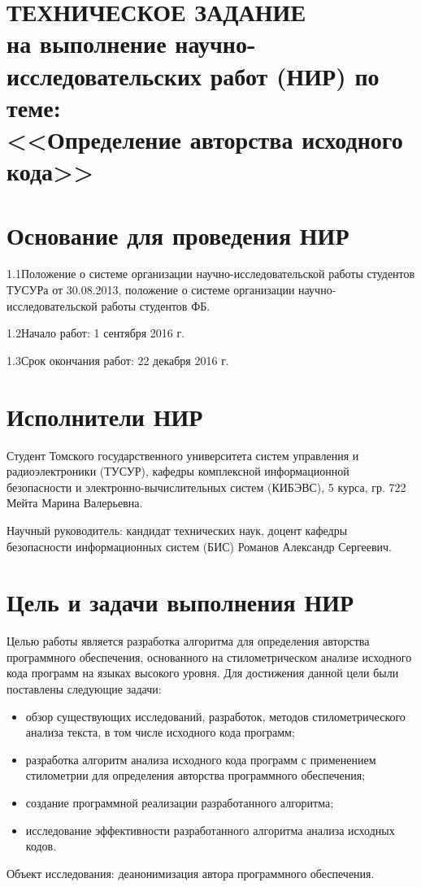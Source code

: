 
\section*{ТЕХНИЧЕСКОЕ ЗАДАНИЕ\\
на выполнение научно-исследовательских работ (НИР) по теме:\\
<<Определение авторства исходного кода>>}


\section{Основание для проведения НИР}

1.1\hspace{5mm}Положение о системе организации научно-исследовательской работы студентов ТУСУРа от 30.08.2013, положение о системе организации научно-исследовательской работы студентов ФБ.
 
1.2\hspace{5mm}Начало работ: 1 сентября 2016 г.

1.3\hspace{5mm}Срок окончания работ: 22 декабря 2016 г.

\section{Исполнители НИР}

Студент Томского государственного университета систем управления и радиоэлектроники (ТУСУР), кафедры комплексной информационной безопасности и электронно-вычислительных систем (КИБЭВС), 5 курса, гр. 722 Мейта Марина Валерьевна.

Научный руководитель: кандидат технических наук, доцент кафедры безопасности информационных систем (БИС) Романов Александр Сергеевич.

\section{Цель и задачи выполнения НИР}

Целью работы является разработка алгоритма для определения авторства программного обеспечения, основанного на стилометрическом анализе исходного кода программ на языках высокого уровня. Для достижения данной цели были поставлены следующие задачи:
\begin{itemize}
  \item обзор существующих исследований, разработок, методов стилометрического анализа текста, в том числе исходного кода программ; 
  \item разработка алгоритм анализа исходного кода программ с применением стилометрии для определения авторства программного обеспечения;
  \item создание программной реализации разработанного алгоритма;
  \item исследование эффективности разработанного алгоритма анализа исходных кодов.
\end{itemize}
Объект исследования: деанонимизация автора программного обеспечения.

